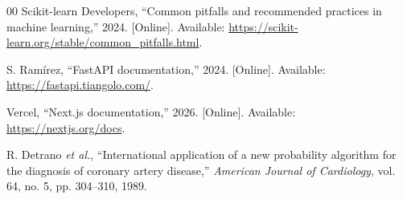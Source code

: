 \documentclass[conference]{IEEEtran}
\begin{document}
\begin{thebibliography}{00}
Scikit-learn Developers, ``Common pitfalls and recommended practices in machine learning,'' 2024. [Online]. Available: \url{https://scikit-learn.org/stable/common_pitfalls.html}.

S. Ram\'{i}rez, ``FastAPI documentation,'' 2024. [Online]. Available: \url{https://fastapi.tiangolo.com/}.

Vercel, ``Next.js documentation,'' 2026. [Online]. Available: \url{https://nextjs.org/docs}.

R. Detrano \emph{et al.}, ``International application of a new probability algorithm for the diagnosis of coronary artery disease,'' \emph{American Journal of Cardiology}, vol. 64, no. 5, pp. 304--310, 1989.

\end{thebibliography}
\end{document}
